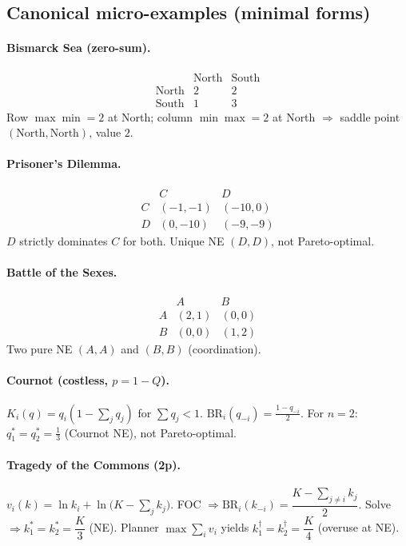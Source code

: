 \documentclass[11pt]{article}
\newcommand{\BR}{\mathrm{BR}}
\begin{document}
\begin{multicols}{2}
\subsection*{Canonical micro-examples (minimal forms)}
\paragraph{Bismarck Sea (zero-sum).}
\[
\begin{array}{c|cc}
& \text{North} & \text{South}\\\hline
\text{North} & 2 & 2\\
\text{South} & 1 & 3
\end{array}
\]
Row $\max\min=2$ at North; column $\min\max=2$ at North $\Rightarrow$ saddle point $(\text{North},\text{North})$, value $2$.

\paragraph{Prisoner’s Dilemma.}
\[
\begin{array}{c|cc}
 & C & D\\\hline
C &(-1,-1)&(-10,0)\\
D &(0,-10)&(-9,-9)
\end{array}
\]
$D$ strictly dominates $C$ for both. Unique NE $(D,D)$, not Pareto-optimal.

\paragraph{Battle of the Sexes.}
\[
\begin{array}{c|cc}
 & A & B\\\hline
A&(2,1)&(0,0)\\
B&(0,0)&(1,2)
\end{array}
\]
Two pure NE $(A,A)$ and $(B,B)$ (coordination).

\paragraph{Cournot (costless, $p=1-Q$).} $K_i(q)=q_i(1-\sum_j q_j)$ for $\sum q_j<1$. $\BR_i(q_{-i})=\tfrac{1-q_{-i}}{2}$. For $n=2$: $q_1^*=q_2^*=\tfrac13$ (Cournot NE), not Pareto-optimal.

\paragraph{Tragedy of the Commons (2p).} $v_i(k)=\ln k_i+\ln\!\big(K-\sum_j k_j\big)$.
FOC $\Rightarrow \BR_i(k_{-i})=\dfrac{K-\sum_{j\ne i}k_j}{2}$.
Solve $\Rightarrow k_1^*=k_2^*=\dfrac{K}{3}$ (NE). Planner $\max \sum_i v_i$ yields $k_1^\dagger=k_2^\dagger=\dfrac{K}{4}$ (overuse at NE).





\end{multicols}
\end{document}
